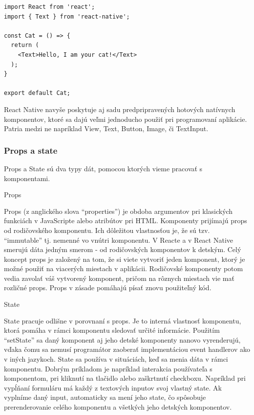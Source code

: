 \begin{itemize}[leftmargin=*]
\begin{lstlisting}[caption={Príklad function komponentu}, label={funcComponent}]
import React from 'react';
import { Text } from 'react-native';

const Cat = () => {
  return (
    <Text>Hello, I am your cat!</Text>
  );
}

export default Cat;
\end{lstlisting}

\end{itemize}

React Native navyše poskytuje aj sadu predpripravených hotových natívnych komponentov, ktoré sa dajú veľmi jednoducho použiť pri programovaní aplikácie. Patria medzi ne napríklad View, Text, Button, Image, či TextInput. \\

\subsubsection{Props a state}
Props a State sú dva typy dát, pomocou ktorých vieme pracovať s komponentami.
\begin{itemize}[leftmargin=*]
{\bf \item Props} \newline
Props (z anglického slova ``properties'') je obdoba argumentov pri klasických funkciách v JavaScripte alebo atribútov pri HTML. Komponenty prijímajú props od rodičovského komponentu. Ich dôležitou vlastnosťou je, že sú tzv. ``immutable'' tj. nemenné vo vnútri komponentu. V Reacte a v React Native smerujú dáta jedným smerom - od rodičovských komponentov k detským. Celý koncept props je založený na tom, že si viete vytvoriť jeden komponent, ktorý je možné použiť na viacerých miestach v aplikácii. Rodičovské komponenty potom vedia zavolať váš vytvorený komponent, pričom na rôznych miestach vie mať rozličné props. Props v zásade pomáhajú písať znovu použiteľný kód. \cite{props}
{\bf \item State} \newline
State pracuje odlišne v porovnaní s props. Je to interná vlastnosť komponentu, ktorá pomáha v rámci komponentu sledovať určité informácie. Použitím ``setState'' sa daný komponent aj jeho detské komponenty nanovo vyrenderujú, vďaka čomu sa nemusí programátor zaoberať implementáciou event handlerov ako v iných jazykoch. State sa používa v situáciách, keď sa menia dáta v rámci komponentu. Dobrým príkladom je napríklad interakcia používateľa s komponentom, pri kliknutí na tlačidlo alebo zaškrtnutí checkboxu. Napríklad pri vypĺňaní formuláru má každý z textových inputov svoj vlastný state. Ak vyplníme daný input, automaticky sa mení jeho state, čo spôsobuje prerenderovanie celého komponentu a všetkých jeho detských komponentov. \cite{props} \\
\end{itemize} 
